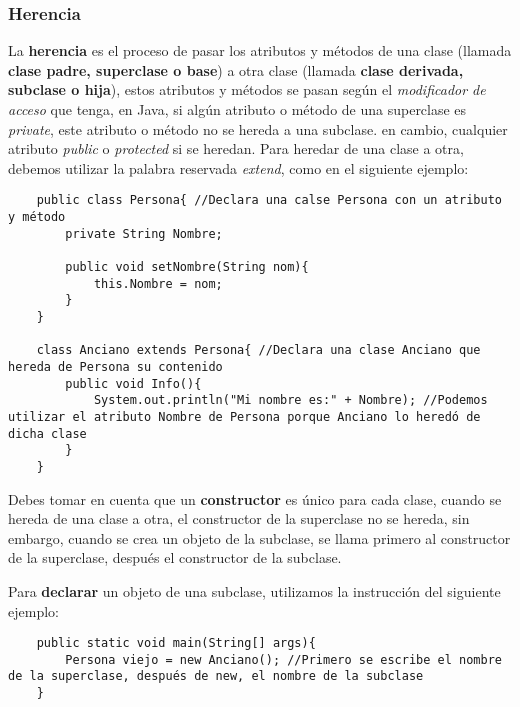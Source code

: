 \subsubsection{Herencia}
\hspace{0.55cm}La \textbf{herencia} es el proceso de pasar los atributos y métodos de una clase (llamada \textbf{clase padre, superclase o base}) a otra clase (llamada \textbf{clase derivada, subclase o hija}), estos atributos y métodos se pasan según el \textit{modificador de acceso} que tenga, en Java, si algún atributo o método de una superclase es \textit{private}, este atributo o método no se hereda a una subclase. en cambio, cualquier atributo \textit{public} o \textit{protected} si se heredan. Para heredar de una clase a otra, debemos utilizar la palabra reservada \textit{extend}, como en el siguiente ejemplo:
\begin{lstlisting}
    public class Persona{ //Declara una calse Persona con un atributo y método
        private String Nombre;
        
        public void setNombre(String nom){
            this.Nombre = nom;
        }
    }
    
    class Anciano extends Persona{ //Declara una clase Anciano que hereda de Persona su contenido
        public void Info(){
            System.out.println("Mi nombre es:" + Nombre); //Podemos utilizar el atributo Nombre de Persona porque Anciano lo heredó de dicha clase
        }
    }
\end{lstlisting}

Debes tomar en cuenta que un \textbf{constructor} es único para cada clase, cuando se hereda de una clase a otra, el constructor de la superclase no se hereda, sin embargo, cuando se crea un objeto de la subclase, se llama primero al constructor de la superclase, después el constructor de la subclase.

Para \textbf{declarar} un objeto de una subclase, utilizamos la instrucción del siguiente ejemplo:
\begin{lstlisting}
    public static void main(String[] args){
        Persona viejo = new Anciano(); //Primero se escribe el nombre de la superclase, después de new, el nombre de la subclase
    }
\end{lstlisting}


